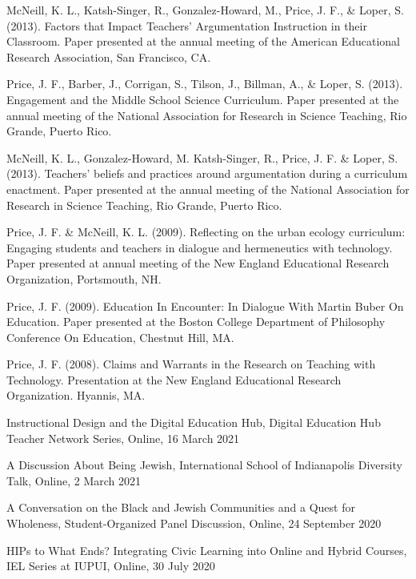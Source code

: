 \documentclass[11pt,article,oneside]{memoir}
\begin{document}
\ind McNeill, K. L., Katsh-Singer, R., Gonzalez-Howard, M., Price, J. F., \& Loper, S. (2013). Factors that Impact Teachers’ Argumentation Instruction in their Classroom. Paper presented at the annual meeting of the American Educational Research Association, San Francisco, CA. 

\ind Price, J. F., Barber, J., Corrigan, S., Tilson, J., Billman, A., \& Loper, S. (2013). Engagement and the Middle School Science Curriculum. Paper presented at the annual meeting of the National Association for Research in Science Teaching, Rio Grande, Puerto Rico. 

\ind McNeill, K. L., Gonzalez-Howard, M. Katsh-Singer, R., Price, J. F. \& Loper, S. (2013). Teachers’ beliefs and practices around argumentation during a curriculum enactment. Paper presented at the annual meeting of the National Association for Research in Science Teaching, Rio Grande, Puerto Rico.

\ind Price, J. F. \& McNeill, K. L. (2009). Reflecting on the urban ecology curriculum: Engaging students and teachers in dialogue and hermeneutics with technology. Paper presented at annual meeting of the New England Educational Research Organization, Portsmouth, NH. 

\ind Price, J. F. (2009). Education In Encounter: In Dialogue With Martin Buber On Education. Paper presented at the Boston College Department of Philosophy Conference On Education, Chestnut Hill, MA. 

\ind Price, J. F. (2008). Claims and Warrants in the Research on Teaching with Technology. Presentation at the New England Educational Research Organization. Hyannis, MA.

\newpage



\ind Instructional Design and the Digital Education Hub, Digital Education Hub Teacher Network Series, Online, 16 March 2021

\ind A Discussion About Being Jewish, International School of Indianapolis Diversity Talk, Online, 2 March 2021

\ind A Conversation on the Black and Jewish Communities and a Quest for Wholeness, Student-Organized Panel Discussion, Online, 24 September 2020

\ind HIPs to What Ends? Integrating Civic Learning into Online and Hybrid Courses, IEL Series at IUPUI, Online, 30 July 2020
\end{document}
